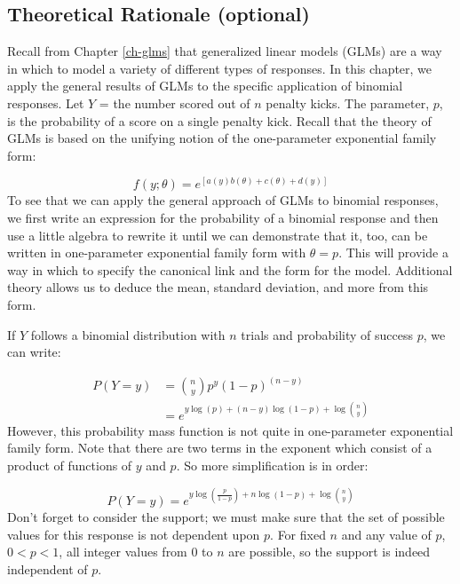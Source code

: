 \documentclass[
]{krantz}
\begin{document}
\subsection{Theoretical Rationale (optional)}\label{theoretical-rationale-optional}

Recall from Chapter \ref{ch-glms} that generalized linear models (GLMs)  are a way in which to model a variety of different types of responses. In this chapter, we apply the general results of GLMs to the specific application of binomial responses. Let \(Y\) = the number scored out of \(n\) penalty kicks. The parameter, \(p\), is the probability of a score on a single penalty kick. Recall that the theory of GLMs is based on the unifying notion of the one-parameter exponential family form:

\begin{equation*}
f(y;\theta)=e^{[a(y)b(\theta)+c(\theta)+d(y)]}
\end{equation*}
To see that we can apply the general approach of GLMs  to binomial responses, we first write an expression for the probability of a binomial response and then use a little algebra to rewrite it until we can demonstrate that it, too, can be written in one-parameter exponential family form with \(\theta = p\). This will provide a way in which to specify the canonical link and the form for the model. Additional theory allows us to deduce the mean, standard deviation, and more from this form.

If \(Y\) follows a binomial distribution with \(n\) trials and probability of success \(p\), we can write:

\begin{align*}
P(Y=y)&= \binom{n}{y}p^y(1-p)^{(n-y)} \\
      &=e^{y\log(p) + (n-y)\log(1-p) + \log\binom{n}{y}}
\end{align*}
However, this probability mass function is not quite in one-parameter exponential family form. Note that there are two terms in the exponent which consist of a product of functions of \(y\) and \(p\). So more simplification is in order:

\begin{equation*}
P(Y=y) = e^{y\log\left(\frac{p}{1-p}\right) + n\log(1-p)+ \log\binom{n}{y}}
\end{equation*}
Don't forget to consider the support; we must make sure that the set of possible values for this response is not dependent upon \(p\). For fixed \(n\) and any value of \(p\), \(0<p<1\), all integer values from \(0\) to \(n\) are possible, so the support is indeed independent of \(p\).
\end{document}
